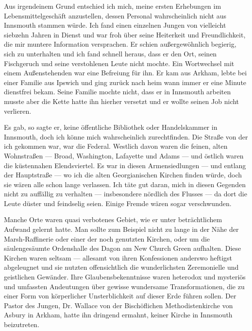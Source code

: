 Aus irgendeinem Grund entschied ich mich, meine ersten Erhebungen im Lebensmittelgeschäft anzustellen, dessen Personal wahrscheinlich nicht aus Innsmouth stammen würde. Ich fand einen einzelnen Jungen von vielleicht siebzehn Jahren in Dienst und war froh über seine Heiterkeit und Freundlichkeit, die mir muntere Information versprachen. Er schien außergewöhnlich begierig, sich zu unterhalten und ich fand schnell heraus, dass er den Ort, seinen Fischgeruch und seine verstohlenen Leute nicht mochte. Ein Wortwechsel mit einem Außenstehenden war eine Befreiung für ihn. Er kam aus Arkham, lebte bei einer Familie aus Ipswich und ging zurück nach heim wann immer er eine Minute dienstfrei bekam. Seine Familie mochte nicht, dass er in Innsmouth arbeiten musste aber die Kette hatte ihn hierher versetzt und er wollte seinen Job nicht verlieren.

Es gab, so sagte er, keine öffentliche Bibliothek oder Handelskammer in Innsmouth, doch ich könne mich wahrscheinlich zurechtfinden. Die Straße von der ich gekommen war, war die Federal. Westlich davon waren die feinen, alten Wohnstraßen --- Broad, Washington, Lafayette und Adams --- und östlich waren die küstennahen Elendsviertel. Es war in diesen Armensiedlungen --- und entlang der Hauptstraße --- wo ich die alten Georgianischen Kirchen finden würde, doch sie wären alle schon lange verlassen. Ich täte gut daran, mich in diesen Gegenden nicht zu auffällig zu verhalten --- insbesondere nördlich des Flusses --- da dort die Leute düster und feindselig seien. Einige Fremde wären sogar verschwunden.

Manche Orte waren quasi verbotenes Gebiet, wie er unter beträchtlichem Aufwand gelernt hatte. Man sollte zum Beispiel nicht zu lange in der Nähe der Marsh-Raffinerie oder einer der noch genutzten Kirchen, oder um die säulengesäumte Ordenshalle des Dagon am New Church Green aufhalten. Diese Kirchen waren seltsam --- allesamt von ihren Konfessionen anderswo heftigst abgeleugnet und sie nutzten offensichtlich die wunderlichsten Zeremonielle und geistlichen Gewänder. Ihre Glaubensbekenntnisse waren heterodox und mysteriös und umfassten Andeutungen über gewisse wundersame Transformationen, die zu einer Form von körperlicher Unsterblichkeit auf dieser Erde führen sollen. Der Pastor des Jungen, Dr. Wallace von der Bischöflichen Methodistenkirche von Asbury in Arkham, hatte ihn dringend ermahnt, keiner Kirche in Innsmouth beizutreten.

